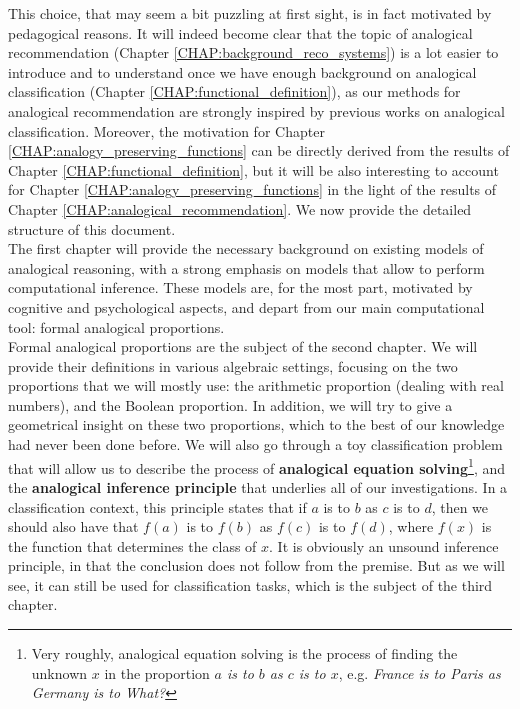 This choice, that may seem a bit
puzzling at first sight, is in fact motivated by pedagogical reasons. It will
indeed become clear that the topic of analogical recommendation (Chapter
\ref{CHAP:background_reco_systems}) is a lot easier to introduce and to
understand once we have enough background on analogical classification (Chapter
\ref{CHAP:functional_definition}), as our methods for analogical recommendation
are strongly inspired by previous works on analogical classification. Moreover,
the motivation for Chapter \ref{CHAP:analogy_preserving_functions} can be
directly derived from the results of Chapter \ref{CHAP:functional_definition},
but it will be also interesting to account for Chapter
\ref{CHAP:analogy_preserving_functions} in the light of the results of Chapter
\ref{CHAP:analogical_recommendation}.  We now provide the detailed structure of
this document.\\

The first chapter will provide the necessary background on existing
models of analogical reasoning, with a strong emphasis on models that allow to
perform computational inference. These models are, for the most part, motivated
by cognitive and psychological aspects, and depart from our main computational
tool: formal analogical proportions.\\

Formal analogical proportions are the subject of the second chapter. We will
provide their definitions in various algebraic settings,
focusing on the two proportions that we will mostly use: the arithmetic
proportion (dealing with real numbers), and the Boolean proportion. In
addition, we will try to give a geometrical insight on these two proportions,
which to the best of our knowledge had never been
done before. We will also go through a toy classification problem that will
allow us to describe the process of \textbf{analogical equation
solving}\footnote{Very roughly, analogical equation solving is the process of
finding the unknown $x$ in the proportion \textit{$a$ is to $b$ as $c$ is to
$x$}, e.g. \textit{France is to Paris as Germany is to What?}}, and the
\textbf{analogical inference principle} that underlies all
of our investigations. In a classification context, this
principle states that if $a$ is to $b$ as $c$ is to $d$,
then we should also have that $f(a)$ is to $f(b)$ as $f(c)$ is to $f(d)$, where
$f(x)$ is the function that determines the class of $x$. It is obviously an
unsound inference principle, in that the conclusion does not follow from the
premise. But as we will see, it can still be used for classification tasks,
which is the subject of the third chapter.\\

